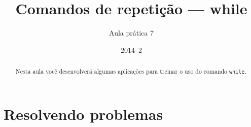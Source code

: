 \documentclass[11pt,fleqn]{practice}
\begin{document}
\subtitle{Aula prática 7}
\title{Comandos de repetição --- \textbf{while}}
\author{}
\date{2014--2}
\maketitle

\begin{abstract}
  Nesta aula você desenvolverá algumas aplicações para treinar o uso do
  comando \texttt{while}.
\end{abstract}

\tableofcontents

\section{Resolvendo problemas}
\end{document}
